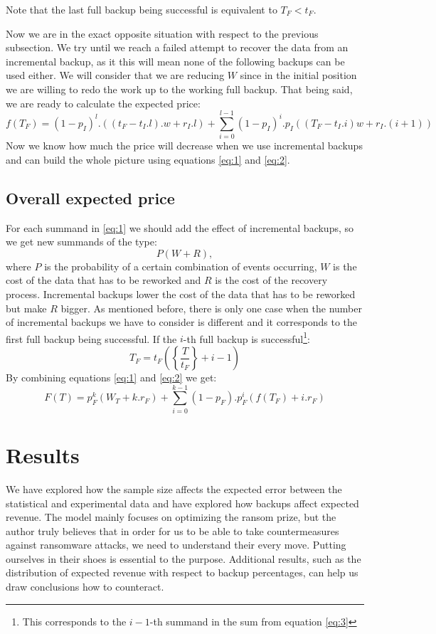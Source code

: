 \documentclass[11pt, a4paper]{article}
\theoremstyle{definition}
\begin{document}
		Note that the last full backup being successful is equivalent to $T_F<t_F$.\par
		Now we are in the exact opposite situation with respect to the previous subsection. We try until we reach a failed attempt to recover the data from an incremental backup, as it this will mean none of the following backups can be used either. We will consider that we are reducing $W$ since in the initial position we are willing to redo the work up to the working full backup. That being said, we are ready to calculate the expected price:
		\begin{equation}
		\label{eq:2}
			f(T_F) = (1-p_I)^l.((t_F-t_I.l).w + r_I.l) + \displaystyle \sum_{i=0}^{l-1} (1-p_I)^{i}.p_I((T_F-t_I.i)w + r_I.(i+1))
		\end{equation}
		Now we know how much the price will decrease when we use incremental backups and can build the whole picture using equations \ref{eq:1} and \ref{eq:2}.
		\subsection{Overall expected price}
		For each summand in \ref{eq:1} we should add the effect of incremental backups, so we get new summands of the type:
		$$
		P(W + R),
		$$
		where $P$ is the probability of a certain combination of events occurring, $W$ is the cost of the data that has to be reworked and $R$ is the cost of the recovery process. Incremental backups lower the cost of the data that has to be reworked but make $R$ bigger. As mentioned before, there is only one case when the number of incremental backups we have to consider is different and it corresponds to the first full backup being successful. If the $i$-th full backup is successful\footnote{This corresponds to the $i-1$-th summand in the sum from equation \ref{eq:3}}:
		$$
		T_F=t_F\left(\left\{ \frac{T}{t_F} \right\} + i - 1\right)
		$$
		By combining equations \ref{eq:1} and \ref{eq:2} we get:
		\begin{equation}\label{eq:3}
			F(T) = p_F^{k}(W_T+k.r_F) + \displaystyle\sum_{i=0}^{k-1}(1-p_F).p_F^{i}\left(f(T_F) + i.r_F\right)
		\end{equation}
		
\section{Results}
	We have explored how the sample size affects the expected error between the statistical and experimental data and have explored how backups affect expected revenue. The model mainly focuses on optimizing the ransom prize, but the author truly believes that in order for us to be able to take countermeasures against ransomware attacks, we need to understand their every move. Putting ourselves in their shoes is essential to the purpose. Additional results, such as the distribution of expected revenue with respect to backup percentages, can help us draw conclusions how to counteract.
\end{document}
